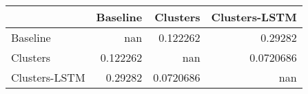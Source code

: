 \begin{tabular}{lrrr}
\toprule
               &   Baseline &    Clusters &   Clusters-LSTM \\
\midrule
 Baseline      & nan        &   0.122262  &       0.29282   \\
 Clusters      &   0.122262 & nan         &       0.0720686 \\
 Clusters-LSTM &   0.29282  &   0.0720686 &     nan         \\
\bottomrule
\end{tabular}